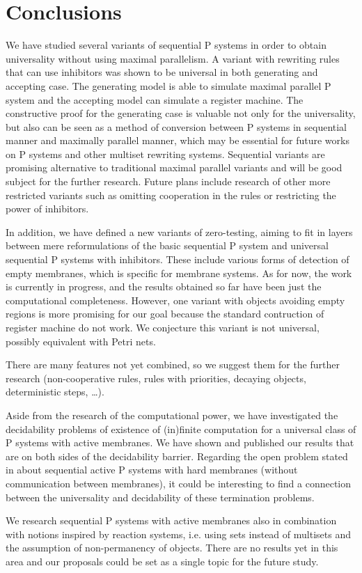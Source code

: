 \chapter*{Conclusions}
We have studied several variants of sequential P systems in order to obtain universality without using maximal parallelism. A variant with rewriting rules that can use inhibitors was shown to be universal in both generating and accepting case. The generating model is able to simulate maximal parallel P system and the accepting model can simulate a register machine.
The constructive proof for the generating case is valuable not only for the universality, but also can be seen as a method of conversion between P systems in sequential manner and maximally parallel manner, which may be essential for future works on P systems and other multiset rewriting systems. Sequential variants are promising alternative to traditional maximal parallel variants and will be good subject for the further research. Future plans include research of other more restricted variants such as omitting cooperation in the rules or restricting the power of inhibitors.

In addition, we have defined a new variants of zero-testing, aiming to fit in layers between mere reformulations of the basic sequential P system and universal sequential P systems with inhibitors. These include various forms of detection of empty membranes, which is specific for membrane systems. As for now, the work is currently in progress, and the results obtained so far have been just the computational completeness. However, one variant with objects avoiding empty regions is more promising for our goal because the standard contruction of register machine do not work. We conjecture this variant is not universal, possibly equivalent with Petri nets.

There are many features not yet combined, so we suggest them for the further research (non-cooperative rules, rules with priorities, decaying objects, deterministic steps, \ldots).

Aside from the research of the computational power, we have investigated the decidability problems of existence of (in)finite computation for a universal class of P systems with active membranes. We have shown and published our results that are on both sides of the decidability barrier. Regarding the open problem stated in \cite{Ibarra05Active} about sequential active P systems with hard membranes (without communication between membranes), it could be interesting to find a connection between the universality and decidability of these termination problems.

We research sequential P systems with active membranes also in combination with notions inspired by reaction systems, i.e. using sets instead of multisets and the assumption of non-permanency of objects. There are no results yet in this area and our proposals could be set as a single topic for the future study.